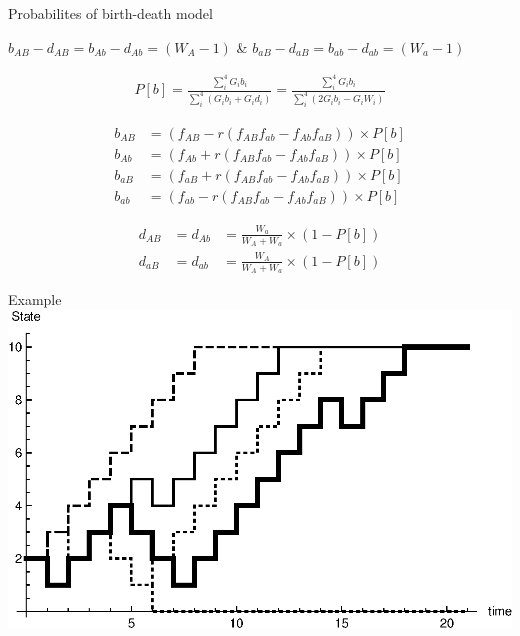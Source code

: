 \documentclass{beamer}
\begin{document}
\begin{frame}{Probabilites of birth-death model}

    $b_{AB}-d_{AB} = b_{Ab}-d_{Ab}=(W_A-1)$ \& $b_{aB}-d_{aB} = b_{ab}-d_{ab}=(W_a-1)$
    
    \begin{equation*}
    \begin{aligned}
        P[b] = \frac{\sum_i^4 G_i b_i}{\sum_i^4 (G_i b_i + G_i d_i)} = \frac{\sum_i^4 G_i b_i}{\sum_i^4 (2 G_i b_i - G_i W_i)}
    \end{aligned}
    \end{equation*}
    
    \begin{equation*}
    \begin{aligned}
        b_{AB} &= (f_{AB}-r(f_{AB}f_{ab}-f_{Ab}f_{aB}))\times P[b]\\
        b_{Ab} &= (f_{Ab}+r(f_{AB}f_{ab}-f_{Ab}f_{aB}))\times P[b]\\
        b_{aB} &= (f_{aB}+r(f_{AB}f_{ab}-f_{Ab}f_{aB}))\times P[b]\\
        b_{ab} &= (f_{ab}-r(f_{AB}f_{ab}-f_{Ab}f_{aB}))\times P[b]
    \end{aligned}
    \end{equation*} 
    
    \begin{equation*}
    \begin{aligned}
        d_{AB} &= d_{Ab} &= \frac{W_a}{W_A+W_a}\times (1-P[b]) \\
        d_{aB} &= d_{ab} &= \frac{W_A}{W_A+W_a}\times (1-P[b]) 
    \end{aligned}
    \end{equation*}
    
  
    
\end{frame}

\begin{frame}{Example}
    \includegraphics{RealizationMarkov.eps}
\end{frame}
\end{document}
